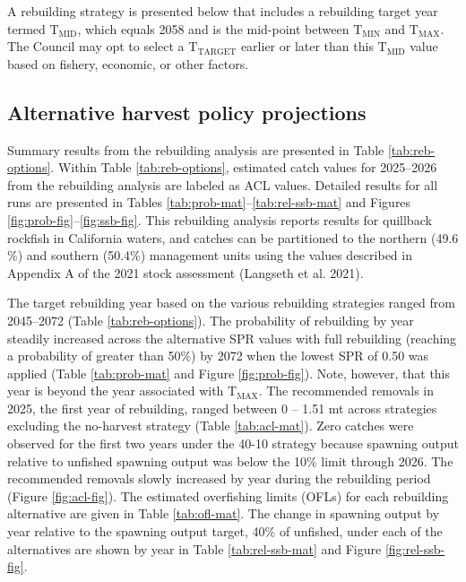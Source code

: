 \documentclass[11pt,
  letterpaper,
]{article}
\begin{document}
A rebuilding strategy is presented below that includes a rebuilding target year termed \(\text{T}_\text{MID}\), which equals 2058 and is the mid-point between \(\text{T}_\text{MIN}\) and \(\text{T}_\text{MAX}\). The Council may opt to select a \(\text{T}_\text{TARGET}\) earlier or later than this \(\text{T}_\text{MID}\) value based on fishery, economic, or other factors.

\hypertarget{alternative-harvest-policy-projections}{%
\subsection{Alternative harvest policy projections}\label{alternative-harvest-policy-projections}}

Summary results from the rebuilding analysis are presented in Table \ref{tab:reb-options}. Within Table \ref{tab:reb-options}, estimated catch values for 2025--2026 from the rebuilding analysis are labeled as ACL values. Detailed results for all runs are presented in Tables \ref{tab:prob-mat}--\ref{tab:rel-ssb-mat} and Figures \ref{fig:prob-fig}--\ref{fig:ssb-fig}. This rebuilding analysis reports results for quillback rockfish in California waters, and catches can be partitioned to the northern (49.6\(\%\)) and southern (50.4\(\%\)) management units using the values described in Appendix A of the 2021 stock assessment (Langseth et al. 2021).

The target rebuilding year based on the various rebuilding strategies ranged from 2045--2072 (Table \ref{tab:reb-options}). The probability of rebuilding by year steadily increased across the alternative SPR values with full rebuilding (reaching a probability of greater than 50\(\%\)) by 2072 when the lowest SPR of 0.50 was applied (Table \ref{tab:prob-mat} and Figure \ref{fig:prob-fig}). Note, however, that this year is beyond the year associated with \(\text{T}_\text{MAX}\). The recommended removals in 2025, the first year of rebuilding, ranged between 0 -- 1.51 mt across strategies excluding the no-harvest strategy (Table \ref{tab:acl-mat}). Zero catches were observed for the first two years under the 40-10 strategy because spawning output relative to unfished spawning output was below the 10\(\%\) limit through 2026. The recommended removals slowly increased by year during the rebuilding period (Figure \ref{fig:acl-fig}). The estimated overfishing limits (OFLs) for each rebuilding alternative are given in Table \ref{tab:ofl-mat}. The change in spawning output by year relative to the spawning output target, 40\(\%\) of unfished, under each of the alternatives are shown by year in Table \ref{tab:rel-ssb-mat} and Figure \ref{fig:rel-ssb-fig}.
\end{document}
